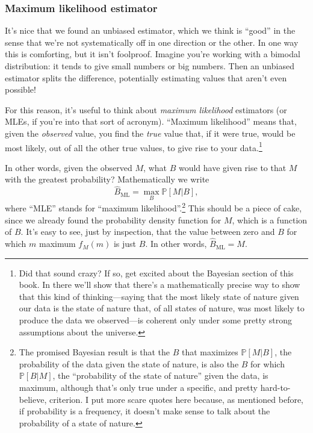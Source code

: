 \documentclass{book}
\begin{document}
\subsubsection{Maximum likelihood
estimator}\label{maximum-likelihood-estimator}

It's nice that we found an unbiased estimator, which we think is
``good'' in the sense that we're not systematically off in one direction
or the other. In one way this is comforting, but it isn't foolproof.
Imagine you're working with a bimodal distribution: it tends to give
small numbers or big numbers. Then an unbiased estimator splits the
difference, potentially estimating values that aren't even possible!

For this reason, it's useful to think about \emph{maximum likelihood}
estimators (or MLEs, if you're into that sort of acronym). ``Maximum
likelihood'' means that, given the \emph{observed} value, you find the
\emph{true} value that, if it were true, would be most likely, out of
all the other true values, to give rise to your data.\footnote{Did that
  sound crazy? If so, get excited about the Bayesian section of this
  book. In there we'll show that there's a mathematically precise way to
  show that this kind of thinking---saying that the most likely state of
  nature given our data is the state of nature that, of all states of
  nature, was most likely to produce the data we observed---is coherent
  only under some pretty strong assumptions about the universe.}

In other words, given the observed \(M\), what \(B\) would have given
rise to that \(M\) with the greatest probability? Mathematically we
write \[
\hat{B}_\mathrm{ML} = \max_B \mathbb{P}[M | B],
\] where ``MLE'' stands for ``maximum likelihood''.\footnote{The
  promised Bayesian result is that the \(B\) that maximizes
  \(\mathbb{P}[M | B]\), the probability of the data given the state of
  nature, is also the \(B\) for which \(\mathbb{P}[B | M]\), the
  ``probability of the state of nature'' given the data, is maximum,
  although that's only true under a specific, and pretty
  hard-to-believe, criterion. I put more scare quotes here because, as
  mentioned before, if probability is a frequency, it doesn't make sense
  to talk about the probability of a state of nature.} This should be a
piece of cake, since we already found the probability density function
for \(M\), which is a function of \(B\). It's easy to see, just by
inspection, that the value between zero and \(B\) for which \(m\)
maximum \(f_M(m)\) is just \(B\). In other words,
\(\hat{B}_\mathrm{ML} = M\).
\end{document}
